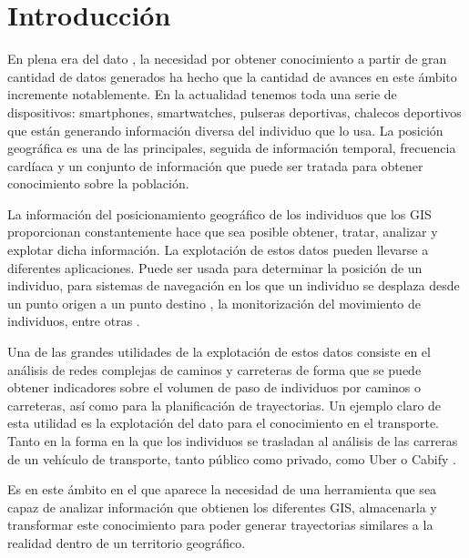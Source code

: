 
\chapter{Introducción}

En plena era del dato \cite{Borkovich01}, la necesidad por obtener conocimiento a partir de gran cantidad de datos generados ha hecho que la cantidad de avances en este ámbito incremente notablemente. En la actualidad tenemos toda una serie de dispositivos: smartphones, smartwatches, pulseras deportivas, chalecos deportivos que están generando información diversa del individuo que lo usa. La posición geográfica es una de las principales, seguida de información temporal, frecuencia cardíaca y un conjunto de información que puede ser tratada para obtener conocimiento sobre la población. 

La información del posicionamiento geográfico  de los individuos que los \ac{GIS} proporcionan constantemente hace que sea posible obtener, tratar, analizar y explotar dicha información. La explotación de estos datos pueden llevarse a diferentes aplicaciones. Puede ser usada para determinar la posición de un individuo, para sistemas de navegación en los que un individuo se desplaza desde un punto origen a un punto destino , la monitorización del movimiento de individuos, entre otras \cite{GPS01}. 

Una de las grandes utilidades de la explotación de estos datos consiste en el análisis de redes complejas de caminos y carreteras de forma que se puede obtener indicadores sobre el volumen de paso de individuos por caminos o carreteras, así como para la planificación de trayectorias. Un ejemplo claro de esta utilidad es la explotación del dato para el conocimiento en el transporte.  Tanto en la forma en la que los individuos se trasladan al análisis de las carreras de un vehículo de transporte, tanto público como privado, como Uber o Cabify \cite{Viskic01}.  

Es en este ámbito en el que aparece la necesidad de una herramienta que sea capaz de analizar información que obtienen los diferentes \ac{GIS}, almacenarla y transformar este conocimiento para poder generar trayectorias similares a la realidad dentro de un territorio geográfico.

